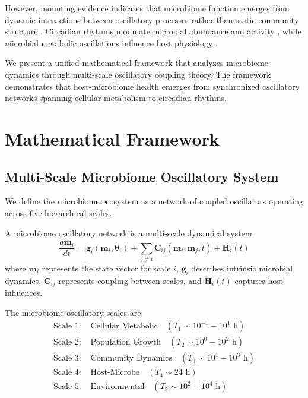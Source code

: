 \documentclass[twocolumn]{article}
\begin{document}
However, mounting evidence indicates that microbiome function emerges from dynamic interactions between oscillatory processes rather than static community structure \citep{thaiss2014transkingdom,zarrinpar2014diet}. Circadian rhythms modulate microbial abundance and activity \citep{liang2015rhythmicity,thaiss2016microbiota}, while microbial metabolic oscillations influence host physiology \citep{martinez2013gut,sharon2014time}.

We present a unified mathematical framework that analyzes microbiome dynamics through multi-scale oscillatory coupling theory. The framework demonstrates that host-microbiome health emerges from synchronized oscillatory networks spanning cellular metabolism to circadian rhythms.

\section{Mathematical Framework}

\subsection{Multi-Scale Microbiome Oscillatory System}

We define the microbiome ecosystem as a network of coupled oscillators operating across five hierarchical scales.

\begin{definition}
A microbiome oscillatory network is a multi-scale dynamical system:
\begin{equation}
\frac{d\mathbf{m}_i}{dt} = \mathbf{g}_i(\mathbf{m}_i, \boldsymbol{\theta}_i) + \sum_{j \neq i} \mathbf{C}_{ij}(\mathbf{m}_i, \mathbf{m}_j, t) + \mathbf{H}_i(t)
\label{eq:microbiome_network}
\end{equation}
where $\mathbf{m}_i$ represents the state vector for scale $i$, $\mathbf{g}_i$ describes intrinsic microbial dynamics, $\mathbf{C}_{ij}$ represents coupling between scales, and $\mathbf{H}_i(t)$ captures host influences.
\end{definition}

\begin{definition}
The microbiome oscillatory scales are:
\begin{align}
\text{Scale 1: } &\text{Cellular Metabolic} \quad (T_1 \sim 10^{-1}-10^1 \text{ h}) \label{eq:cellular_metabolic} \\
\text{Scale 2: } &\text{Population Growth} \quad (T_2 \sim 10^0-10^2 \text{ h}) \label{eq:population_growth} \\
\text{Scale 3: } &\text{Community Dynamics} \quad (T_3 \sim 10^1-10^3 \text{ h}) \label{eq:community_dynamics} \\
\text{Scale 4: } &\text{Host-Microbe} \quad (T_4 \sim 24 \text{ h}) \label{eq:host_microbe} \\
\text{Scale 5: } &\text{Environmental} \quad (T_5 \sim 10^2-10^4 \text{ h}) \label{eq:environmental}
\end{align}
\end{definition}
\end{document}
